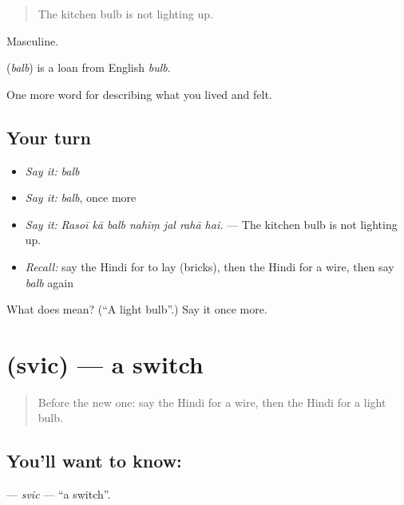 \begin{quote}
The kitchen bulb is not lighting up.
\end{quote}

Masculine.

\begin{cousinweb}
\textbf{} (\emph{balb}) is a loan from English \emph{bulb}.
\end{cousinweb}

\begin{grammarlens}[title={What you've built}]
One more word for describing what you lived and felt.
\end{grammarlens}

\subsection*{Your turn}
\begin{itemize}
\raggedright
  \item \emph{Say it:} \emph{balb}
  \item \emph{Say it:} \emph{balb}, once more
  \item \emph{Say it:} \emph{Rasoī kā balb nahīṃ jal rahā hai.} — The kitchen bulb is not lighting up.
  \item \emph{Recall:} say the Hindi for to lay (bricks), then the Hindi for a wire, then say \emph{balb} again
\end{itemize}

\begin{tcolorbox}[breakable,colback=teal!4,colframe=teal!35!black,title={Before you move on}]
What does  mean? (\textquotedblleft{}A light bulb\textquotedblright{}.) Say it once more.
\end{tcolorbox}
\section[\texorpdfstring{\hi{स्विच} (svic)}{स्विच (svic)}]{ (svic) — a switch}

\label{lesson:HI-C518-svic}



\begin{quote}
Before the new one: say the Hindi for a wire, then the Hindi for a light bulb.
\end{quote}

\subsection*{You'll want to know: }
\textbf{} — \emph{svic} — \textquotedblleft{}a switch\textquotedblright{}.

